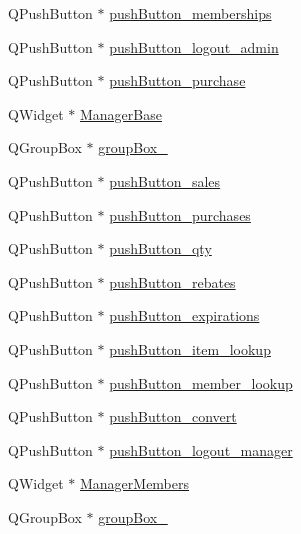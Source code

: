 \begin{DoxyCompactItemize}
\item 
Q\+Push\+Button $\ast$ \hyperlink{class_ui___main_window_a9442123bc000a9d613875a83f71ed86b}{push\+Button\+\_\+memberships}
\item 
Q\+Push\+Button $\ast$ \hyperlink{class_ui___main_window_a715390a97fbad34c624d754dc757a3b0}{push\+Button\+\_\+logout\+\_\+admin}
\item 
Q\+Push\+Button $\ast$ \hyperlink{class_ui___main_window_a56ae9c241312886ffb1a80d6584db877}{push\+Button\+\_\+purchase}
\item 
Q\+Widget $\ast$ \hyperlink{class_ui___main_window_acad36d574145607220734890072167e3}{Manager\+Base}
\item 
Q\+Group\+Box $\ast$ \hyperlink{class_ui___main_window_a320d3d7ba1cb8fff7b7b95923ed10f5e}{group\+Box\+\_}
\item 
Q\+Push\+Button $\ast$ \hyperlink{class_ui___main_window_a82290fdbb08511acdc028708748b1a5f}{push\+Button\+\_\+sales}
\item 
Q\+Push\+Button $\ast$ \hyperlink{class_ui___main_window_ac327ba2721ca461f2e2212320e5997c4}{push\+Button\+\_\+purchases}
\item 
Q\+Push\+Button $\ast$ \hyperlink{class_ui___main_window_a9c4089de63c8c4af8d83891465d24fac}{push\+Button\+\_\+qty}
\item 
Q\+Push\+Button $\ast$ \hyperlink{class_ui___main_window_a32c5e1361e22ebece982ec0e0010e849}{push\+Button\+\_\+rebates}
\item 
Q\+Push\+Button $\ast$ \hyperlink{class_ui___main_window_a9d3e7d4a3eabfd3427ecd2165d2b28bb}{push\+Button\+\_\+expirations}
\item 
Q\+Push\+Button $\ast$ \hyperlink{class_ui___main_window_a2fc2a28bd663f5bf8c73b13e18cd940b}{push\+Button\+\_\+item\+\_\+lookup}
\item 
Q\+Push\+Button $\ast$ \hyperlink{class_ui___main_window_a48fe79c14c062505e1e617af794ca062}{push\+Button\+\_\+member\+\_\+lookup}
\item 
Q\+Push\+Button $\ast$ \hyperlink{class_ui___main_window_a2c039d057072eb5f23b73bcc563d013c}{push\+Button\+\_\+convert}
\item 
Q\+Push\+Button $\ast$ \hyperlink{class_ui___main_window_a725b090e2e8d5aa8ecd4cc0bd41f2cc4}{push\+Button\+\_\+logout\+\_\+manager}
\item 
Q\+Widget $\ast$ \hyperlink{class_ui___main_window_a5e0008b06efe5ec9c4fcd4f54af1360e}{Manager\+Members}
\item 
Q\+Group\+Box $\ast$ \hyperlink{class_ui___main_window_ad8a919e5634add9c41bfc319cb9fd338}{group\+Box\+\_}

\end{DoxyCompactItemize}
